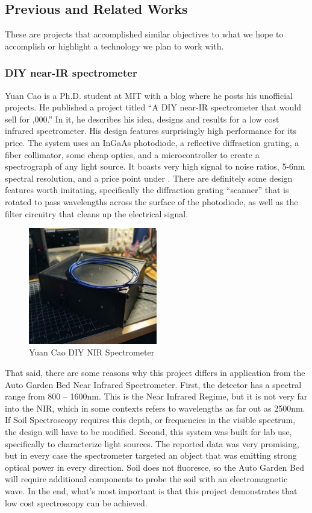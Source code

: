 \subsection{Previous and Related Works}
These are projects that accomplished similar objectives to what we hope to accomplish or highlight a technology we plan to work with.
\subsubsection{DIY near-IR spectrometer}
Yuan Cao is a Ph.D. student at MIT with a blog where he posts his unofficial projects. He published a project titled “A  DIY near-IR spectrometer that would sell for ,000.” In it, he describes his idea, designs and results for a low cost infrared spectrometer. His design features surprisingly high performance for its price. The system uses an InGaAs photodiode, a reflective diffraction grating, a fiber collimator, some cheap optics, and a microcontroller to create a spectrograph of any light source. It boasts very high signal to noise ratios, 5-6nm spectral resolution, and a price point under . There are definitely some design features worth imitating, specifically the diffraction grating “scanner” that is rotated to pass wavelengths across the surface of the photodiode, as well as the filter circuitry that cleans up the electrical signal. 
\begin{figure}[H]
    \caption{Yuan Cao DIY NIR Spectrometer}
    \centering
    \includegraphics[width=0.5\textwidth]{images/3-1-1Pic.png}
\end{figure}
That said, there are some reasons why this project differs in application from the Auto Garden Bed Near Infrared Spectrometer. First, the detector has a spectral range from 800 – 1600nm. This is the Near Infrared Regime, but it is not very far into the NIR, which in some contexts refers to wavelengths as far out as 2500nm. If Soil Spectroscopy requires this depth, or frequencies in the visible spectrum, the design will have to be modified. Second, this system was built for lab use, specifically to characterize light sources. The reported data was very promising, but in every case the spectrometer targeted an object that was emitting strong optical power in every direction. Soil does not fluoresce, so the Auto Garden Bed will require additional components to probe the soil with an electromagnetic wave. In the end, what’s most important is that this project demonstrates that low cost spectroscopy can be achieved.


